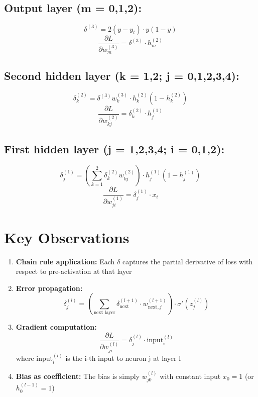 \documentclass{article}
\begin{document}
\subsection*{Output layer (m = 0,1,2):}
\[
\boxed{\delta^{(3)} = 2(y - y_t) \cdot y(1-y)}
\]
\[
\boxed{\frac{\partial L}{\partial w_m^{(3)}} = \delta^{(3)} \cdot h_m^{(2)}}
\]

\subsection*{Second hidden layer (k = 1,2; j = 0,1,2,3,4):}
\[
\boxed{\delta_k^{(2)} = \delta^{(3)} w_k^{(3)} \cdot h_k^{(2)}(1 - h_k^{(2)})}
\]
\[
\boxed{\frac{\partial L}{\partial w_{kj}^{(2)}} = \delta_k^{(2)} \cdot h_j^{(1)}}
\]

\subsection*{First hidden layer (j = 1,2,3,4; i = 0,1,2):}
\[
\boxed{\delta_j^{(1)} = \left( \sum_{k=1}^{2} \delta_k^{(2)} w_{kj}^{(2)} \right) \cdot h_j^{(1)}(1 - h_j^{(1)})}
\]
\[
\boxed{\frac{\partial L}{\partial w_{ji}^{(1)}} = \delta_j^{(1)} \cdot x_i}
\]

\section{Key Observations}

\begin{enumerate}
    \item \textbf{Chain rule application:} Each \( \delta \) captures the partial derivative of loss with respect to pre-activation at that layer
    
    \item \textbf{Error propagation:} 
    \[
    \delta_j^{(l)} = \left( \sum_{\text{next layer}} \delta_{\text{next}}^{(l+1)} \cdot w_{\text{next},j}^{(l+1)} \right) \cdot \sigma'(z_j^{(l)})
    \]
    
    \item \textbf{Gradient computation:} 
    \[
    \frac{\partial L}{\partial w_{ji}^{(l)}} = \delta_j^{(l)} \cdot \text{input}_i^{(l)}
    \]
    where \( \text{input}_i^{(l)} \) is the i-th input to neuron j at layer l
    
    \item \textbf{Bias as coefficient:} The bias is simply \( w_{j0}^{(l)} \) with constant input \( x_0 = 1 \) (or \( h_0^{(l-1)} = 1 \))
\end{enumerate}
\end{document}
